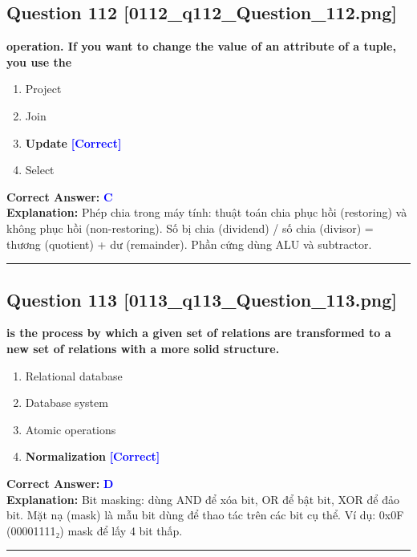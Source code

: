 \documentclass[11pt,a4paper]{article}
\begin{document}
\begin{minipage}{\textwidth}
\subsection*{Question 112 \quad \footnotesize{[0112\_q112\_Question\_112.png]}}
\noindent \textbf{operation. If you want to change the value of an attribute of a tuple, you use the}

\begin{enumerate}[label=\Alph*.]
    \item Project
    \item Join
    \item \textbf{Update} \hfill \textcolor{blue}{\textbf{[Correct]}}
    \item Select
\end{enumerate}

\noindent \textbf{Correct Answer:} \textcolor{blue}{\textbf{C}} \\[2pt]
\noindent \textbf{Explanation:} Phép chia trong máy tính: thuật toán chia phục hồi (restoring) và không phục hồi (non-restoring). Số bị chia (dividend) / số chia (divisor) = thương (quotient) + dư (remainder). Phần cứng dùng ALU và subtractor.

\par\vspace{0.3cm}
\hrule
\vspace{0.3cm}
\end{minipage}

\begin{minipage}{\textwidth}
\subsection*{Question 113 \quad \footnotesize{[0113\_q113\_Question\_113.png]}}
\noindent \textbf{is the process by which a given set of relations are transformed to a new set of relations with a more solid structure.}

\begin{enumerate}[label=\Alph*.]
    \item Relational database
    \item Database system
    \item Atomic operations
    \item \textbf{Normalization} \hfill \textcolor{blue}{\textbf{[Correct]}}
\end{enumerate}

\noindent \textbf{Correct Answer:} \textcolor{blue}{\textbf{D}} \\[2pt]
\noindent \textbf{Explanation:} Bit masking: dùng AND để xóa bit, OR để bật bit, XOR để đảo bit. Mặt nạ (mask) là mẫu bit dùng để thao tác trên các bit cụ thể. Ví dụ: 0x0F (00001111₂) mask để lấy 4 bit thấp.

\par\vspace{0.3cm}
\hrule
\vspace{0.3cm}
\end{minipage}
\end{document}
